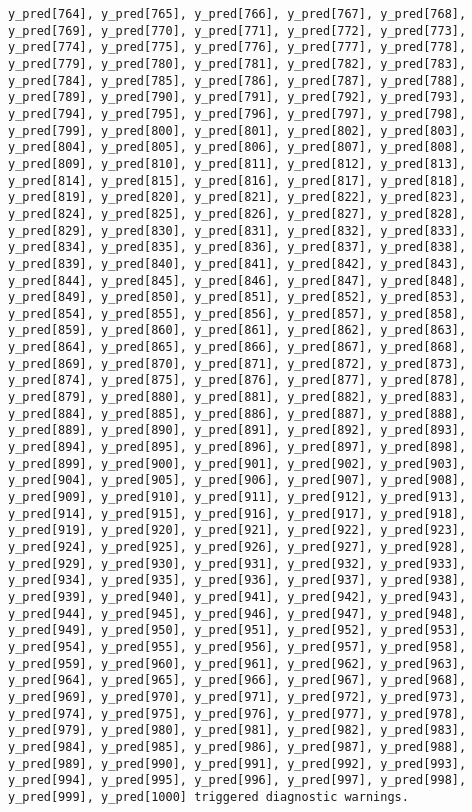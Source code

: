 \documentclass[
  letterpaper,
  DIV=11,
  numbers=noendperiod]{scrartcl}
\begin{document}
\begin{verbatim}
y_pred[764], y_pred[765], y_pred[766], y_pred[767], y_pred[768],
y_pred[769], y_pred[770], y_pred[771], y_pred[772], y_pred[773],
y_pred[774], y_pred[775], y_pred[776], y_pred[777], y_pred[778],
y_pred[779], y_pred[780], y_pred[781], y_pred[782], y_pred[783],
y_pred[784], y_pred[785], y_pred[786], y_pred[787], y_pred[788],
y_pred[789], y_pred[790], y_pred[791], y_pred[792], y_pred[793],
y_pred[794], y_pred[795], y_pred[796], y_pred[797], y_pred[798],
y_pred[799], y_pred[800], y_pred[801], y_pred[802], y_pred[803],
y_pred[804], y_pred[805], y_pred[806], y_pred[807], y_pred[808],
y_pred[809], y_pred[810], y_pred[811], y_pred[812], y_pred[813],
y_pred[814], y_pred[815], y_pred[816], y_pred[817], y_pred[818],
y_pred[819], y_pred[820], y_pred[821], y_pred[822], y_pred[823],
y_pred[824], y_pred[825], y_pred[826], y_pred[827], y_pred[828],
y_pred[829], y_pred[830], y_pred[831], y_pred[832], y_pred[833],
y_pred[834], y_pred[835], y_pred[836], y_pred[837], y_pred[838],
y_pred[839], y_pred[840], y_pred[841], y_pred[842], y_pred[843],
y_pred[844], y_pred[845], y_pred[846], y_pred[847], y_pred[848],
y_pred[849], y_pred[850], y_pred[851], y_pred[852], y_pred[853],
y_pred[854], y_pred[855], y_pred[856], y_pred[857], y_pred[858],
y_pred[859], y_pred[860], y_pred[861], y_pred[862], y_pred[863],
y_pred[864], y_pred[865], y_pred[866], y_pred[867], y_pred[868],
y_pred[869], y_pred[870], y_pred[871], y_pred[872], y_pred[873],
y_pred[874], y_pred[875], y_pred[876], y_pred[877], y_pred[878],
y_pred[879], y_pred[880], y_pred[881], y_pred[882], y_pred[883],
y_pred[884], y_pred[885], y_pred[886], y_pred[887], y_pred[888],
y_pred[889], y_pred[890], y_pred[891], y_pred[892], y_pred[893],
y_pred[894], y_pred[895], y_pred[896], y_pred[897], y_pred[898],
y_pred[899], y_pred[900], y_pred[901], y_pred[902], y_pred[903],
y_pred[904], y_pred[905], y_pred[906], y_pred[907], y_pred[908],
y_pred[909], y_pred[910], y_pred[911], y_pred[912], y_pred[913],
y_pred[914], y_pred[915], y_pred[916], y_pred[917], y_pred[918],
y_pred[919], y_pred[920], y_pred[921], y_pred[922], y_pred[923],
y_pred[924], y_pred[925], y_pred[926], y_pred[927], y_pred[928],
y_pred[929], y_pred[930], y_pred[931], y_pred[932], y_pred[933],
y_pred[934], y_pred[935], y_pred[936], y_pred[937], y_pred[938],
y_pred[939], y_pred[940], y_pred[941], y_pred[942], y_pred[943],
y_pred[944], y_pred[945], y_pred[946], y_pred[947], y_pred[948],
y_pred[949], y_pred[950], y_pred[951], y_pred[952], y_pred[953],
y_pred[954], y_pred[955], y_pred[956], y_pred[957], y_pred[958],
y_pred[959], y_pred[960], y_pred[961], y_pred[962], y_pred[963],
y_pred[964], y_pred[965], y_pred[966], y_pred[967], y_pred[968],
y_pred[969], y_pred[970], y_pred[971], y_pred[972], y_pred[973],
y_pred[974], y_pred[975], y_pred[976], y_pred[977], y_pred[978],
y_pred[979], y_pred[980], y_pred[981], y_pred[982], y_pred[983],
y_pred[984], y_pred[985], y_pred[986], y_pred[987], y_pred[988],
y_pred[989], y_pred[990], y_pred[991], y_pred[992], y_pred[993],
y_pred[994], y_pred[995], y_pred[996], y_pred[997], y_pred[998],
y_pred[999], y_pred[1000] triggered diagnostic warnings.


\end{verbatim}
\end{document}

